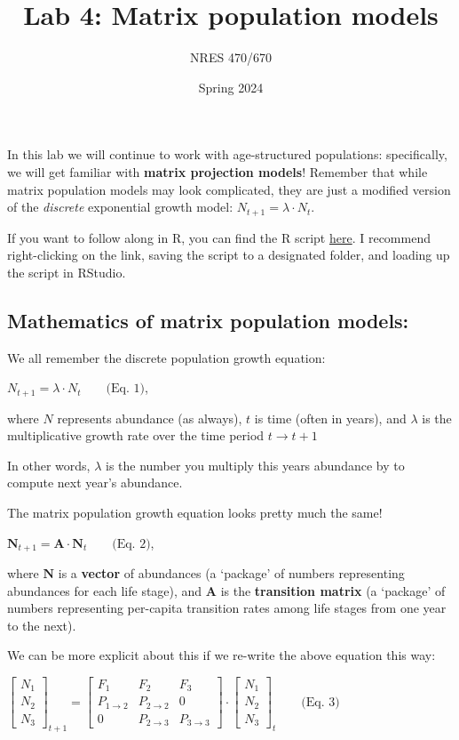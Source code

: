 \documentclass[
]{article}
\title{Lab 4: Matrix population models}
\author{NRES 470/670}
\date{Spring 2024}
\begin{document}
\maketitle

In this lab we will continue to work with age-structured populations:
specifically, we will get familiar with \textbf{matrix projection
models}! Remember that while matrix population models may look
complicated, they are just a modified version of the \emph{discrete}
exponential growth model: \(N_{t+1}=\lambda \cdot N_t\).

If you want to follow along in R, you can find the R script
\href{LAB4.R}{here}. I recommend right-clicking on the link, saving the
script to a designated folder, and loading up the script in RStudio.

\hypertarget{mathematics-of-matrix-population-models}{%
\subsection{Mathematics of matrix population
models:}\label{mathematics-of-matrix-population-models}}

We all remember the discrete population growth equation:

\(N_{t+1}=\lambda \cdot N_t \qquad \text{(Eq. 1)}\),

where \(N\) represents abundance (as always), \(t\) is time (often in
years), and \(\lambda\) is the multiplicative growth rate over the time
period \(t \rightarrow t+1\)

In other words, \(\lambda\) is the number you multiply this years
abundance by to compute next year's abundance.

The matrix population growth equation looks pretty much the same!

\(\mathbf{N}_{t+1} = \mathbf{A} \cdot \mathbf{N}_{t} \qquad \text{(Eq. 2)}\),

where \(\mathbf{N}\) is a \textbf{vector} of abundances (a `package' of
numbers representing abundances for each life stage), and \(\mathbf{A}\)
is the \textbf{transition matrix} (a `package' of numbers representing
per-capita transition rates among life stages from one year to the
next).

We can be more explicit about this if we re-write the above equation
this way:

\(\begin{bmatrix}N_1\\ N_2\\N_3 \end{bmatrix}_{t+1}=\begin{bmatrix}F_1 & F_2 & F_3\\ P_{1 \rightarrow 2} & P_{2 \rightarrow 2} & 0\\ 0 & P_{2 \rightarrow 3} & P_{3 \rightarrow 3}\end{bmatrix} \cdot \begin{bmatrix}N_1\\ N_2\\N_3 \end{bmatrix}_{t} \qquad \text{(Eq. 3)}\)
\end{document}
